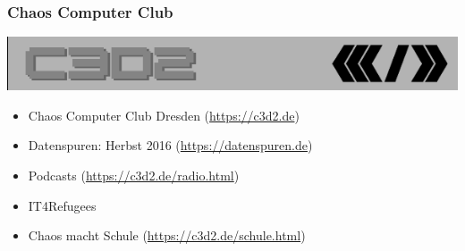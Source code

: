 \begin{frame}
    \frametitle{Chaos Computer Club}
    \begin{center}
	\includegraphics[height=0.1\textheight]{../../img/c3d2_logo.png}
    \end{center}
    \begin{itemize}
      \item<1-> Chaos Computer Club Dresden (\url{https://c3d2.de})
      \item<2-> Datenspuren: Herbst 2016 (\url{https://datenspuren.de})
      \item<3-> Podcasts (\url{https://c3d2.de/radio.html})
      \item<4-> IT4Refugees
      \item<5-> Chaos macht Schule (\url{https://c3d2.de/schule.html})
    \end{itemize}
\end{frame}

